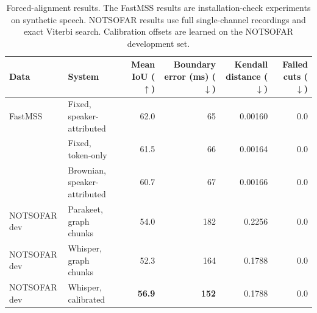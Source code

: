 
\begin{table}[t]
  \centering
  \caption{Forced-alignment results. The FastMSS results are installation-check
  experiments on synthetic speech. NOTSOFAR results use full single-channel
  recordings and exact Viterbi search. Calibration offsets are learned on the
  NOTSOFAR development set.}
  \label{tab:alignment-main}
  \small
  \begin{tabular}{llrrrr}
    \toprule
    Data & System & \shortstack{Mean\\IoU ($\uparrow$)} &
      \shortstack{Boundary\\error (ms) ($\downarrow$)} &
      \shortstack{Kendall\\distance ($\downarrow$)} &
      \shortstack{Failed\\cuts ($\downarrow$)} \\
    \midrule
    FastMSS & Fixed, speaker-attributed       & 62.0 & 65 & 0.00160 & 0.0 \\
            & Fixed, token-only               & 61.5 & 66 & 0.00164 & 0.0 \\
            & Brownian, speaker-attributed    & 60.7 & 67 & 0.00166 & 0.0 \\
    \midrule
    NOTSOFAR dev & Parakeet, graph chunks     & 54.0 & 182 & 0.2256 & 0.0 \\
    NOTSOFAR dev & Whisper, graph chunks      & 52.3 & 164 & 0.1788 & 0.0 \\
    NOTSOFAR dev & Whisper, calibrated        & \textbf{56.9} & \textbf{152} & 0.1788 & 0.0 \\
    \bottomrule
  \end{tabular}
\end{table}

